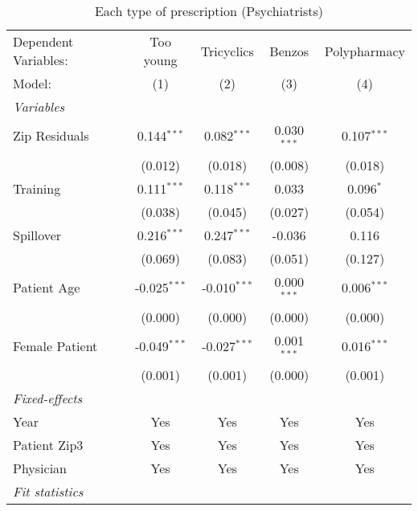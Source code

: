 
\begin{table}[htbp]
   \centering
   \begin{threeparttable}[b]
      \caption{Each type of prescription (Psychiatrists)}
      \begin{tabular}{lcccc}
         \tabularnewline \midrule \midrule
         Dependent Variables:    & Too young      & Tricyclics     & Benzos        & Polypharmacy\\  
         Model:                  & (1)            & (2)            & (3)           & (4)\\  
         \midrule
         \emph{Variables}\\
         Zip Residuals           & 0.144$^{***}$  & 0.082$^{***}$  & 0.030$^{***}$ & 0.107$^{***}$\\   
                                 & (0.012)        & (0.018)        & (0.008)       & (0.018)\\   
         Training                & 0.111$^{***}$  & 0.118$^{***}$  & 0.033         & 0.096$^{*}$\\   
                                 & (0.038)        & (0.045)        & (0.027)       & (0.054)\\   
         Spillover               & 0.216$^{***}$  & 0.247$^{***}$  & -0.036        & 0.116\\   
                                 & (0.069)        & (0.083)        & (0.051)       & (0.127)\\   
         Patient Age             & -0.025$^{***}$ & -0.010$^{***}$ & 0.000$^{***}$ & 0.006$^{***}$\\   
                                 & (0.000)        & (0.000)        & (0.000)       & (0.000)\\   
         Female Patient          & -0.049$^{***}$ & -0.027$^{***}$ & 0.001$^{***}$ & 0.016$^{***}$\\   
                                 & (0.001)        & (0.001)        & (0.000)       & (0.001)\\   
         \midrule
         \emph{Fixed-effects}\\
         Year                    & Yes            & Yes            & Yes           & Yes\\  
         Patient Zip3            & Yes            & Yes            & Yes           & Yes\\  
         Physician               & Yes            & Yes            & Yes           & Yes\\  
         \midrule
         \emph{Fit statistics}\\

\end{tabular}
\end{threeparttable}
\end{table}
